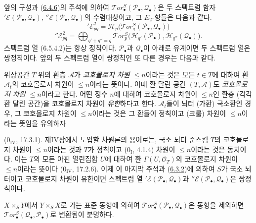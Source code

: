 \begin{env}[6.5.4]
\label{III.6.5.4-fr}
앞의 구성과 (\hyperref[III.6.4.6-fr]{6.4.6})의 주석에 의하여
$\mathscr{T}\!or_\bullet^S(\mathscr P_\bullet,\mathscr Q_\bullet)$은 두
스펙트럼 함자 $'\mathscr E(\mathscr P_\bullet,\mathscr Q_\bullet)$,
$''\mathscr E(\mathscr P_\bullet,\mathscr Q_\bullet)$의 수렴대상이고,
그 $E_2$-항들은 다음과 같다.
\[
  '\mathscr E_{pq}^2
  =\mathscr H_p\bigl(\mathscr{T}\!or_q^S
    (\mathscr P_\bullet,\mathscr Q_\bullet)\bigr)
  \tag{6.5.4.1}\label{III.6.5.4.1.fr}
\]
\[
  ''\mathscr E_{pq}^2
  =\bigoplus_{q'+q''=q}
   \mathscr{T}\!or_p^S
   \bigl(\mathscr H_{q'}(\mathscr P_\bullet),
         \mathscr H_{q''}(\mathscr Q_\bullet)\bigr).
  \tag{6.5.4.2}\label{III.6.5.4.2.fr}
\]
스펙트럼 열 (6.5.4.2)는 항상 정칙이다. $\mathscr P_\bullet$과
$\mathscr Q_\bullet$이 아래로 유계이면 두 스펙트럼 열은 쌍정칙이다.
앞의 두 스펙트럼 열이 쌍정칙인 또 다른 경우는 다음과 같다.
\end{env}

\begin{env}[6.5.5]
\label{III.6.5.5-fr}
위상공간 $T$ 위의 환층 $\mathscr A$가 \emph{코호몰로지 차원
$\leqslant n$}이라는 것은 모든 $t\in T$에 대하여 환 $\mathscr A_t$의
코호몰로지 차원이 $\leqslant n$이라는 뜻이다. 이때 환 달린 공간
$(T,\mathscr A)$도 \emph{코호몰로지 차원 $\leqslant n$}이라고 한다.
어떤 정수 $n$에 대하여 코호몰로지 차원이 $\leqslant n$인 환층
(각각 환 달린 공간)을 코호몰로지 차원이 \emph{유한}하다고 한다.
$\mathscr A_t$들이 뇌터 (가환) 국소환인 경우, 그 코호몰로지 차원이
$\leqslant n$이라는 것은 그 환들이 정칙이고 (크룰) 차원이
$\leqslant n$이라는 뜻임을 유의하자


($0_{\mathrm{IV}}$, 17.3.1). 제IV장에서 도입할 차원론의 용어로는,
국소 뇌터 준스킴 $T$의 코호몰로지 차원이 $\leqslant n$이라는 것과
$T$가 정칙이고 ($0_{\mathrm I}$, 4.1.4) 차원이 $\leqslant n$이라는
것은 동치이다. 이는 $T$의 모든 아핀 열린집합 $U$에 대하여 환
$\Gamma(U,\mathscr O_T)$의 코호몰로지 차원이 $\leqslant n$이라는
뜻이다 ($0_{\mathrm{IV}}$, 17.2.6). 이제 이 마지막 주석과
(\hyperref[III.6.3.2-fr]{6.3.2})에 의하여 $S$가 국소 뇌터이고
코호몰로지 차원이 유한이면 스펙트럼 열
$'\mathscr E(\mathscr P_\bullet,\mathscr Q_\bullet)$과
$''\mathscr E(\mathscr P_\bullet,\mathscr Q_\bullet)$은 쌍정칙이다.

$X\times_S Y$에서 $Y\times_S X$로 가는 표준 동형에 의하여
$\mathscr{T}\!or_\bullet^S(\mathscr P_\bullet,\mathscr Q_\bullet)$은
동형을 제외하면
$\mathscr{T}\!or_\bullet^S(\mathscr Q_\bullet,\mathscr P_\bullet)$로
변환됨이 분명하다.
\end{env}

